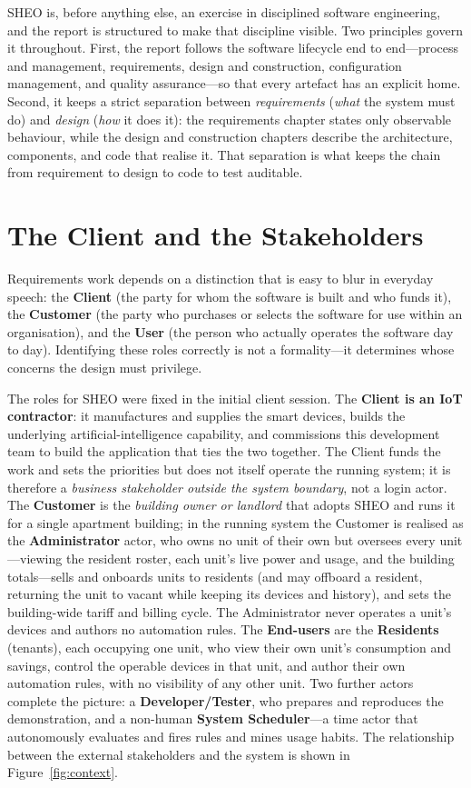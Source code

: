 SHEO is, before anything else, an exercise in disciplined software engineering, and the
report is structured to make that discipline visible. Two principles govern it
throughout. First, the report follows the software lifecycle end to end---process and
management, requirements, design and construction, configuration management, and quality
assurance---so that every artefact has an explicit home. Second, it keeps a strict
separation between \emph{requirements} (\emph{what} the system must do) and \emph{design}
(\emph{how} it does it): the requirements chapter states only observable behaviour, while
the design and construction chapters describe the architecture, components, and code that
realise it. That separation is what keeps the chain from requirement to design to code to
test auditable.

\section{The Client and the Stakeholders}

Requirements work depends on a distinction that is easy to blur in everyday speech: the
\textbf{Client} (the party for whom the software is built and who funds it), the
\textbf{Customer} (the party who purchases or selects the software for use within an
organisation), and the \textbf{User} (the person who actually operates the software day
to day). Identifying these roles correctly is not a formality---it determines whose
concerns the design must privilege.

The roles for SHEO were fixed in the initial client session. The \textbf{Client is an
IoT contractor}: it manufactures and supplies the smart devices, builds the underlying
artificial-intelligence capability, and commissions this development team to build the
application that ties the two together. The Client funds the work and sets the
priorities but does not itself operate the running system; it is therefore a
\emph{business stakeholder outside the system boundary}, not a login actor. The
\textbf{Customer} is the \emph{building owner or landlord} that adopts SHEO
and runs it for a single apartment building; in the running system the Customer is realised as the
\textbf{Administrator} actor, who owns no unit of their own but oversees every unit---viewing
the resident roster, each unit's live power and usage, and the building totals---sells and
onboards units to residents (and may offboard a resident, returning the unit to vacant while
keeping its devices and history), and sets the building-wide tariff and billing cycle. The
Administrator never operates a unit's devices and authors no automation rules. The
\textbf{End-users} are the \textbf{Residents} (tenants), each occupying one unit, who view
their own unit's consumption and savings, control the operable devices in that unit, and
author their own automation rules, with no visibility of any other unit. Two further actors
complete the picture: a \textbf{Developer/Tester}, who prepares and reproduces the
demonstration, and a non-human \textbf{System Scheduler}---a time actor that
autonomously evaluates and fires rules and mines usage habits. The relationship between
the external stakeholders and the system is shown in Figure~\ref{fig:context}.

